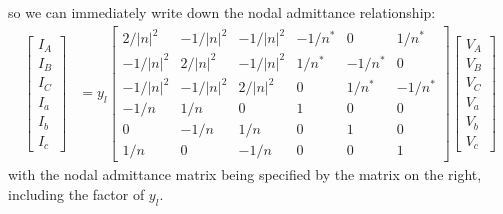 \documentclass[10pt]{article}
\begin{document}
so we can immediately write down the nodal admittance relationship:
\begin{align}
\begin{bmatrix}I_A \\ I_B \\ I_C \\ I_a \\ I_b \\ I_c\end{bmatrix} &=
y_l \begin{bmatrix}
	2/|n|^2 & -1/|n|^2 & -1/|n|^2 & -1/n^* & 0 & 1/n^* \\
	-1/|n|^2 & 2/|n|^2 &  -1/|n|^2 & 1/n^*  & -1/n^* & 0 \\
	-1/|n|^2 &  -1/|n|^2 & 2/|n|^2 & 0 & 1/n^*  & -1/n^* \\
	-1/n & 1/n & 0 & 1 & 0 & 0 \\
	0 & -1/n & 1/n & 0 & 1 & 0 \\
	1/n & 0 & -1/n & 0 & 0 & 1
\end{bmatrix}
\begin{bmatrix}V_A \\ V_B \\ V_C \\ V_a \\ V_b \\ V_c\end{bmatrix}
\end{align}
with the nodal admittance matrix being specified by the matrix on the right, including the factor of $y_l$.
\end{document}
